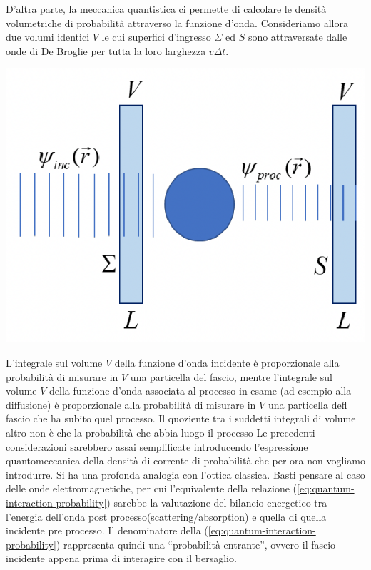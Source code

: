 D’altra parte, la meccanica quantistica ci permette di calcolare le densità
volumetriche di probabilità attraverso la funzione d’onda.
Consideriamo allora due volumi identici $V$ le cui superfici d’ingresso $\Sigma$ ed $S$ sono attraversate dalle onde di De Broglie per tutta la loro larghezza $v \Delta t$.
\begin{marginfigure}
	\centering
	\includegraphics{figs/quantum-process-cross-section}
\end{marginfigure}
L’integrale sul volume $V$ della funzione d’onda incidente è proporzionale alla probabilità di misurare in $V$ una particella del fascio, mentre l’integrale sul volume $V$ della funzione d’onda associata al processo in esame (ad esempio alla diffusione) è proporzionale alla probabilità di misurare in $V$ una particella defl fascio che ha subito quel processo.
Il quoziente tra i suddetti integrali di volume altro non è che la probabilità che abbia luogo il processo\sidenote
{
	Le precedenti considerazioni sarebbero assai semplificate introducendo l’espressione quantomeccanica della
	densità di corrente di probabilità che per ora non vogliamo introdurre.
}\sidenote
{
	Si ha una profonda analogia con l'ottica classica. Basti pensare al caso delle onde elettromagnetiche, per cui l'equivalente
della relazione (\ref{eq:quantum-interaction-probability}) sarebbe la valutazione del bilancio energetico
tra l'energia dell'onda post processo(scattering/absorption) e quella di quella incidente pre processo.
Il denominatore della (\ref{eq:quantum-interaction-probability}) rappresenta quindi una ``probabilità entrante'',
	ovvero il fascio incidente appena prima di interagire con il bersaglio.
}
